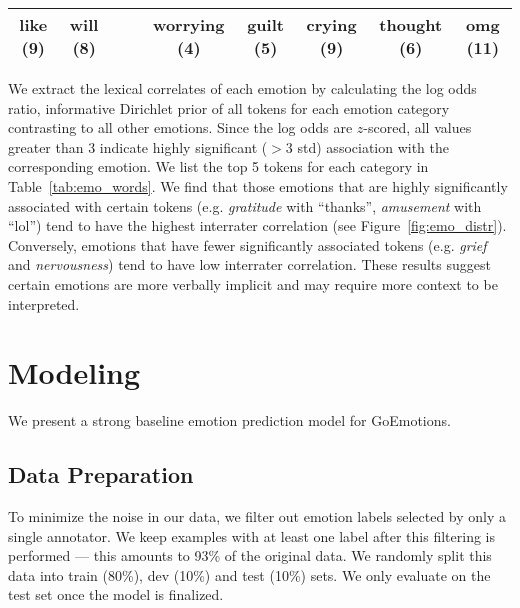 \documentclass[11pt,a4paper]{article}
\begin{document}
\begin{table*}[t!]
{\begin{centering}
\begin{tabular}{|cccc|ccccc|}
like (9)                                 & will (8)                                 &                                            &                                         & worrying (4)                              & guilt (5)                                   & \multicolumn{1}{c|}{crying (9)}                                   & thought (6)                                & omg (11)                                \\
\hline
\end{tabular}
    \end{centering}
    }
    \caption{Top 5 words associated with each emotion (\colorbox[HTML]{BEECAF}{positive},\colorbox[HTML]{A6CBF7}{negative}, \colorbox[HTML]{FFFC9E}{ambiguous}). The rounded $z$-scored log odds ratios in the parentheses, with the threshold set at 3, indicate significance of association.}
    \label{tab:emo_words}
\end{table*}

We extract the lexical correlates of each emotion by calculating the log odds ratio, informative Dirichlet prior \citep{monroe2008fightin} of all tokens for each emotion category contrasting to all other emotions. Since the log odds are $z$-scored, all values greater than 3 indicate highly significant ($>$3 std) association with the corresponding emotion. We list the top 5 tokens for each category in Table~\ref{tab:emo_words}. We find that those emotions that are highly significantly associated with certain tokens (e.g. \emph{gratitude} with ``thanks'', \emph{amusement} with ``lol'') tend to have the highest interrater correlation (see Figure~\ref{fig:emo_distr}). Conversely, emotions that have fewer significantly associated tokens (e.g. \emph{grief} and \emph{nervousness}) tend to have low interrater correlation. These results suggest certain emotions are more verbally implicit and may require more context to be interpreted. \section{Modeling}

We present a strong baseline emotion prediction model for GoEmotions.

\subsection{Data Preparation}

To minimize the noise in our data, we filter out emotion labels selected by only a single annotator. We keep examples with at least one label after this filtering is performed --- this amounts to 93\% of the original data. We randomly split this data into train (80\%), dev (10\%) and test (10\%) sets. We only evaluate on the test set once the model is finalized.
\end{document}
